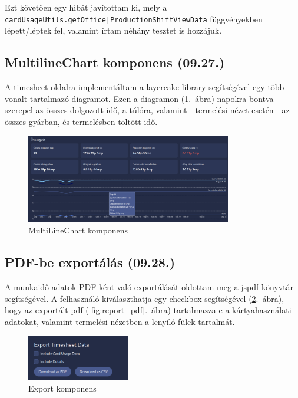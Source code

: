 \documentclass[a4paper]{article}
\newcommand{\inlts}[1]{\texttt{#1}}
\begin{document}
Ezt követően egy hibát javítottam ki, mely a
\inlts{cardUsageUtils.getOffice|ProductionShiftViewData} függvényekben lépett/léptek fel,
valamint írtam néhány tesztet is hozzájuk.

\subsection{MultilineChart komponens (09.27.)}

A timesheet oldalra implementáltam a \href{https://layercake.graphics/}{layercake} library segítségével egy több vonalt tartalmazó
diagramot. Ezen a diagramon (\ref{fig:chart}.~ábra) napokra bontva szerepel az összes dolgozott idő, a túlóra, valamint -
termelési nézet esetén - az összes gyárban, és termelésben töltött idő.

\begin{figure}[ht]
  \centering
  \includegraphics[width = 0.8\textwidth]{images/chart.png}
  \caption{MultiLineChart komponens}
  \label{fig:chart}
\end{figure}

\subsection{PDF-be exportálás (09.28.)}

A munkaidő adatok PDF-ként való exportálását
oldottam meg a \href{https://www.npmjs.com/package/jspdf}{jspdf} könyvtár segítségével. A
felhasználó kiválaszthatja egy checkbox
segítségével (\ref{fig:export_component}.~ábra), hogy az exportált pdf (\ref{fig:report_pdf}.~ábra) tartalmazza e a
kártyahasználati adatokat, valamint termelési
nézetben a lenyíló fülek tartalmát.

\begin{figure}[ht]
  \centering
  \includegraphics[width=0.4\textwidth]{images/export.png}
  \caption{Export komponens}
  \label{fig:export_component}
\end{figure}
\end{document}
